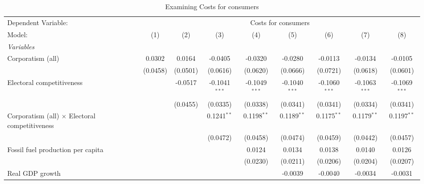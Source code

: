 
\begin{table}[htbp]
   \caption{Examining Costs for consumers}
   \centering
   \begin{tabular}{lcccccccc}
      \tabularnewline \midrule \midrule
      Dependent Variable: & \multicolumn{8}{c}{Costs for consumers}\\
      Model:                                                & (1)      & (2)      & (3)             & (4)             & (5)             & (6)             & (7)             & (8)\\  
      \midrule
      \emph{Variables}\\
      Corporatism (all)                                     & 0.0302   & 0.0164   & -0.0405         & -0.0320         & -0.0280         & -0.0113         & -0.0134         & -0.0105\\   
                                                            & (0.0458) & (0.0501) & (0.0616)        & (0.0620)        & (0.0666)        & (0.0721)        & (0.0618)        & (0.0601)\\   
      Electoral competitiveness                             &          & -0.0517  & -0.1041$^{***}$ & -0.1049$^{***}$ & -0.1040$^{***}$ & -0.1060$^{***}$ & -0.1063$^{***}$ & -0.1069$^{***}$\\   
                                                            &          & (0.0455) & (0.0335)        & (0.0338)        & (0.0341)        & (0.0341)        & (0.0334)        & (0.0341)\\   
      Corporatism (all) $\times$ Electoral competitiveness  &          &          & 0.1241$^{**}$   & 0.1198$^{**}$   & 0.1189$^{**}$   & 0.1175$^{**}$   & 0.1179$^{**}$   & 0.1197$^{**}$\\   
                                                            &          &          & (0.0472)        & (0.0458)        & (0.0474)        & (0.0459)        & (0.0442)        & (0.0457)\\   
      Fossil fuel production per capita                     &          &          &                 & 0.0124          & 0.0134          & 0.0138          & 0.0140          & 0.0126\\   
                                                            &          &          &                 & (0.0230)        & (0.0211)        & (0.0206)        & (0.0204)        & (0.0207)\\   
      Real GDP growth                                       &          &          &                 &                 & -0.0039         & -0.0040         & -0.0034         & -0.0031\\   

\end{tabular}
\end{table}
